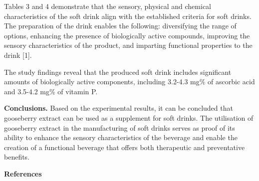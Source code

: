 \begin{multicols}{2}

Tables 3 and 4 demonstrate that the sensory, physical and chemical
characteristics of the soft drink align with the established criteria
for soft drinks. The preparation of the drink enables the following:
diversifying the range of options, enhancing the presence of
biologically active compounds, improving the sensory characteristics of
the product, and imparting functional properties to the drink {[}1{]}.~

The study findings reveal that the produced soft drink includes
significant amounts of biologically active components, including 3.2-4.3
mg\% of ascorbic acid and 3.5-4.2 mg\% of vitamin P.

{\bfseries Conclusions.} Based on the experimental results, it can be
concluded that gooseberry extract can be used as a supplement for soft
drinks. The utilisation of gooseberry extract in the manufacturing of
soft drinks serves as proof of its ability to enhance the sensory
characteristics of the beverage and enable the creation of a functional
beverage that offers both therapeutic and preventative benefits.

\end{multicols}


\begin{center}
  {\bfseries References}
  \end{center}
  
